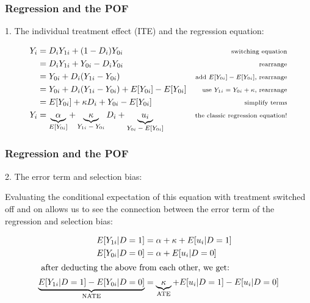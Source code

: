 \documentclass[12pt,english,dvipsnames,aspectratio=169,handout]{beamer}\usepackage[]{graphicx}\usepackage[]{xcolor}
\begin{document}
\begin{frame}
\frametitle{Regression and the POF}

1. The individual treatment effect (ITE) and the regression equation:

\small
  \begin{align*}
Y_i &= D_i Y_{1i} + (1-D_i) Y_{0i} & \text{\scriptsize switching equation} \\
		&=D_i Y_{1i} + Y_{0i} - D_i Y_{0i} & \text{\scriptsize rearrange} \\
		&= Y_{0i} + D_i(Y_{1i} - Y_{0i}) & \text{\scriptsize add $E[Y_{0i}] - E[Y_{0i}]$, rearrange} \\
		&= Y_{0i} + D_i(Y_{1i} - Y_{0i}) + E[Y_{0i}] - E[Y_{0i}] &  	\text{\scriptsize use $Y_{1i}= Y_{0i} + \kappa$, rearrange}	\\
		&= E[Y_{0i}] + \kappa D_i + Y_{0i} - E[Y_{0i}] & \text{\scriptsize simplify terms} \\
Y_i	&=\underbrace{\alpha}_{\textrm{$E[Y_{0i}]$}} + \underbrace{\kappa}_{\textrm{$Y_{1i} - Y_{0i}$}}D_i + \underbrace{u_i}_{\textrm{$Y_{0i} - E[Y_{0i}]$}} & \text{\scriptsize the classic regression equation!}
  \end{align*}

\end{frame}


\begin{frame}

\frametitle{Regression and the POF}

2. The error term and selection bias:

Evaluating the conditional expectation of this equation with treatment switched off and on allows us to see the connection between the error term of the regression and selection bias:

  \begin{align*}
    E[Y_{1i}|D = 1] &= \alpha + \kappa +  E[u_i|D = 1]\\
    E[Y_{0i}|D = 0] &= \alpha + E[u_i|D = 0]\\
  \shortintertext{ after deducting the above from each other, we get:}
\underbrace{E[Y_{1i}|D = 1] - E[Y_{0i}|D = 0]}_{\textrm{NATE}} &=\underbrace{\kappa}_{\textrm{ATE}} + E[u_i|D = 1] - E[u_i|D = 0]\\
\end{align*}

\end{frame}
\end{document}
